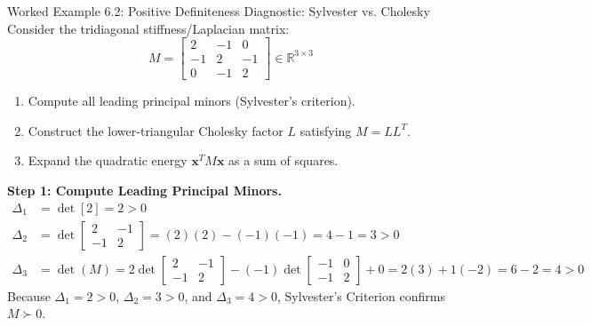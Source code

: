 \begin{examplebox}[breakable]{Worked Example 6.2: Positive Definiteness Diagnostic: Sylvester vs. Cholesky}
Consider the tridiagonal stiffness/Laplacian matrix:
\begin{equation}
M = \begin{bmatrix} 2 & -1 & 0 \\ -1 & 2 & -1 \\ 0 & -1 & 2 \end{bmatrix} \in \mathbb{R}^{3 \times 3}
\end{equation}
\begin{enumerate}
    \item Compute all leading principal minors (Sylvester's criterion).
    \item Construct the lower-triangular Cholesky factor $L$ satisfying $M = L L^T$.
    \item Expand the quadratic energy $\mathbf{x}^T M \mathbf{x}$ as a sum of squares.
\end{enumerate}

\textbf{Step 1: Compute Leading Principal Minors.}
\begin{align}
\Delta_1 &= \det[2] = 2 > 0 \\
\Delta_2 &= \det\begin{bmatrix} 2 & -1 \\ -1 & 2 \end{bmatrix} = (2)(2) - (-1)(-1) = 4 - 1 = 3 > 0 \\
\Delta_3 &= \det(M) = 2 \det\begin{bmatrix} 2 & -1 \\ -1 & 2 \end{bmatrix} - (-1)\det\begin{bmatrix} -1 & 0 \\ -1 & 2 \end{bmatrix} + 0 = 2(3) + 1(-2) = 6 - 2 = 4 > 0
\end{align}
Because $\Delta_1 = 2 > 0$, $\Delta_2 = 3 > 0$, and $\Delta_3 = 4 > 0$, Sylvester's Criterion confirms $M \succ 0$.


\end{examplebox}
